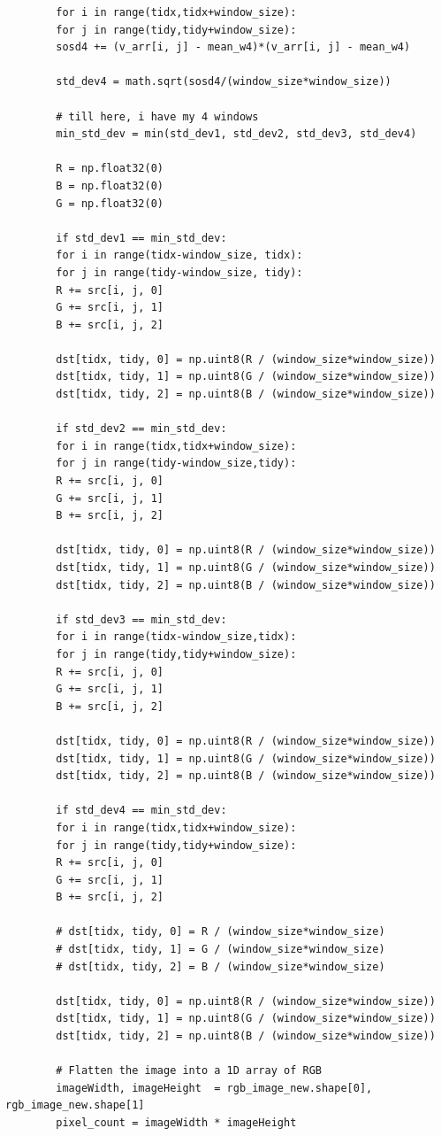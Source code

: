 \documentclass{article}
\begin{document}
\begin{verbatim}
		for i in range(tidx,tidx+window_size):
		for j in range(tidy,tidy+window_size):
		sosd4 += (v_arr[i, j] - mean_w4)*(v_arr[i, j] - mean_w4)
		
		std_dev4 = math.sqrt(sosd4/(window_size*window_size))
		
		# till here, i have my 4 windows
		min_std_dev = min(std_dev1, std_dev2, std_dev3, std_dev4)
		
		R = np.float32(0)
		B = np.float32(0)
		G = np.float32(0)
		
		if std_dev1 == min_std_dev:
		for i in range(tidx-window_size, tidx):
		for j in range(tidy-window_size, tidy):
		R += src[i, j, 0]
		G += src[i, j, 1]
		B += src[i, j, 2]
		
		dst[tidx, tidy, 0] = np.uint8(R / (window_size*window_size))
		dst[tidx, tidy, 1] = np.uint8(G / (window_size*window_size))
		dst[tidx, tidy, 2] = np.uint8(B / (window_size*window_size))
		
		if std_dev2 == min_std_dev:
		for i in range(tidx,tidx+window_size):
		for j in range(tidy-window_size,tidy):
		R += src[i, j, 0]
		G += src[i, j, 1]
		B += src[i, j, 2]
		
		dst[tidx, tidy, 0] = np.uint8(R / (window_size*window_size))
		dst[tidx, tidy, 1] = np.uint8(G / (window_size*window_size))
		dst[tidx, tidy, 2] = np.uint8(B / (window_size*window_size))
		
		if std_dev3 == min_std_dev:
		for i in range(tidx-window_size,tidx):
		for j in range(tidy,tidy+window_size):
		R += src[i, j, 0]
		G += src[i, j, 1]
		B += src[i, j, 2]
		
		dst[tidx, tidy, 0] = np.uint8(R / (window_size*window_size))
		dst[tidx, tidy, 1] = np.uint8(G / (window_size*window_size))
		dst[tidx, tidy, 2] = np.uint8(B / (window_size*window_size))
		
		if std_dev4 == min_std_dev:
		for i in range(tidx,tidx+window_size):
		for j in range(tidy,tidy+window_size):
		R += src[i, j, 0]
		G += src[i, j, 1]
		B += src[i, j, 2]
		
		# dst[tidx, tidy, 0] = R / (window_size*window_size)
		# dst[tidx, tidy, 1] = G / (window_size*window_size)
		# dst[tidx, tidy, 2] = B / (window_size*window_size)
		
		dst[tidx, tidy, 0] = np.uint8(R / (window_size*window_size))
		dst[tidx, tidy, 1] = np.uint8(G / (window_size*window_size))
		dst[tidx, tidy, 2] = np.uint8(B / (window_size*window_size))
		
		# Flatten the image into a 1D array of RGB
		imageWidth, imageHeight  = rgb_image_new.shape[0], rgb_image_new.shape[1]
		pixel_count = imageWidth * imageHeight
		

\end{verbatim}
\end{document}
